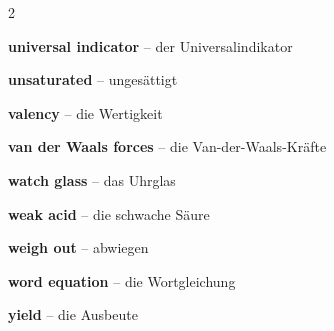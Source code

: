 \begin{multicols}{2}
\par\nopagebreak
\textbf{universal indicator} -- der Universalindikator\dotfill\hyperref[e:161]{\pageref*{e:161}}\par
\textbf{unsaturated} -- ungesättigt\dotfill\hyperref[e:215]{\pageref*{e:215}}\par

\par\nopagebreak
\textbf{valency} -- die Wertigkeit\dotfill\hyperref[e:121]{\pageref*{e:121}}\par
\textbf{van der Waals forces} -- die Van-der-Waals-Kräfte\dotfill\hyperref[e:120]{\pageref*{e:120}}\par

\par\nopagebreak
\textbf{watch glass} -- das Uhrglas\dotfill\hyperref[e:55]{\pageref*{e:55}}\par
\textbf{weak acid} -- die schwache Säure\dotfill\hyperref[e:169]{\pageref*{e:169}}\par
\textbf{weigh out} -- abwiegen\dotfill\hyperref[e:69]{\pageref*{e:69}}\par
\textbf{word equation} -- die Wortgleichung\dotfill\hyperref[e:128]{\pageref*{e:128}}\par

\par\nopagebreak
\textbf{yield} -- die Ausbeute\dotfill\hyperref[e:150]{\pageref*{e:150}}\par
\end{multicols}


